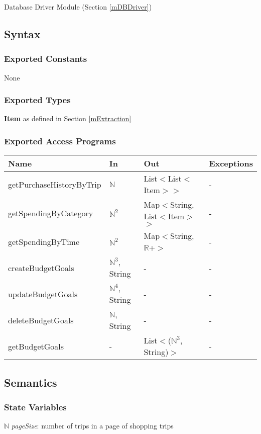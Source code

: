 \documentclass[12pt, titlepage]{article}
\begin{document}
Database Driver Module (Section \ref{mDBDriver})

\subsection{Syntax}

\subsubsection{Exported Constants}
None

\subsubsection{Exported Types}

\textbf{Item} as defined in Section \ref{mExtraction}

\subsubsection{Exported Access Programs}

\begin{center}

\begin{tabular}{p{5cm} p{3cm} p{4cm} p{4cm}}
\hline
\textbf{Name} & \textbf{In} & \textbf{Out} & \textbf{Exceptions} \\
\hline
getPurchaseHistoryByTrip & $\mathbb{N}$ & List$<$List$<$Item$>$$>$  & - \\
getSpendingByCategory & $\mathbb{N}^2$ & Map$<$String, List$<$Item$>$$>$  & - \\
getSpendingByTime & $\mathbb{N}^2$ & Map$<$String, $\mathbb{R}$+$>$ & - \\
createBudgetGoals & $\mathbb{N}^3$, String & - & - \\
updateBudgetGoals & $\mathbb{N}^4$, String & - & - \\
deleteBudgetGoals & $\mathbb{N}$, String & - & - \\
getBudgetGoals & - & List$<$($\mathbb{N}^3$, String)$>$ & - \\
\hline
\end{tabular}
\end{center}

\subsection{Semantics}

\subsubsection{State Variables}
\textbf{$\mathbb{N}$} \textit{pageSize}: number of trips in a page of shopping trips 
\end{document}
